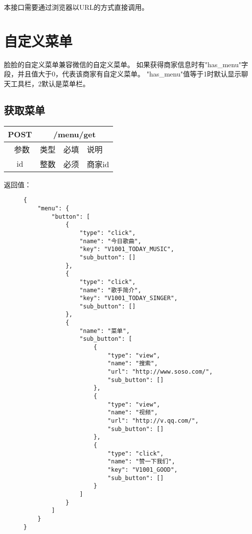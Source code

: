 \documentclass[cs4size]{ctexartutf8}
\begin{document}
本接口需要通过浏览器以URL的方式直接调用。


\section{自定义菜单}
脸脸的自定义菜单兼容微信的自定义菜单。
如果获得商家信息时有"has\_menu"字段，并且值大于0，代表该商家有自定义菜单。 "has\_menu"值等于1时默认显示聊天工具栏，2默认是菜单栏。

\subsection{获取菜单}

\begin{table}[H]
   \begin{center}
\begin{tabular}{|c|c|c|p{12cm}|}
\hline
POST & \multicolumn{3}{|c|}{/menu/get} \\
\hline\hline
 \  参数  & 类型 & 必填 &  说明  \\
   \hline
 id  & 整数 & 必须 & 商家id\\ 
  \hline
\end{tabular}
   \end{center}
\end{table}

返回值：
\begin{figure}[H]
\begin{verbatim}
{
    "menu": {
        "button": [
            {
                "type": "click",
                "name": "今日歌曲",
                "key": "V1001_TODAY_MUSIC",
                "sub_button": []
            },
            {
                "type": "click",
                "name": "歌手简介",
                "key": "V1001_TODAY_SINGER",
                "sub_button": []
            },
            {
                "name": "菜单",
                "sub_button": [
                    {
                        "type": "view",
                        "name": "搜索",
                        "url": "http://www.soso.com/",
                        "sub_button": []
                    },
                    {
                        "type": "view",
                        "name": "视频",
                        "url": "http://v.qq.com/",
                        "sub_button": []
                    },
                    {
                        "type": "click",
                        "name": "赞一下我们",
                        "key": "V1001_GOOD",
                        "sub_button": []
                    }
                ]
            }
        ]
    }
}
\end{verbatim}
\end{figure}
\end{document}

